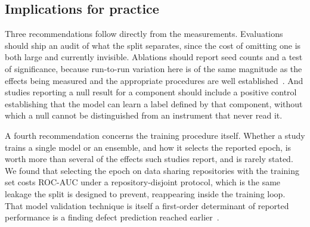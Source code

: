 \subsection{Implications for practice}
Three recommendations follow directly from the measurements. Evaluations should
ship an audit of what the split separates, since the cost of omitting one is
both large and currently invisible. Ablations should report seed counts and a test of significance, because
run-to-run variation here is of the same magnitude as the effects being
measured and the appropriate procedures are
well established~\citep{arcuri2011practical}. And studies reporting a null result for a component should include a
positive control establishing that the model can learn a label defined by that
component, without which a null cannot be distinguished from an instrument that
never read it.

A fourth recommendation concerns the training procedure itself. Whether a study
trains a single model or an ensemble, and how it selects the reported epoch, is
worth more than several of the effects such studies report, and is rarely
stated. We found that selecting the epoch on data sharing repositories with the
training set costs ROC-AUC under a repository-disjoint protocol, which is the
same leakage the split is designed to prevent, reappearing inside the training
loop. That model validation technique is itself a first-order determinant of
reported performance is a finding defect prediction reached
earlier~\citep{tantithamthavorn2017empirical}.
